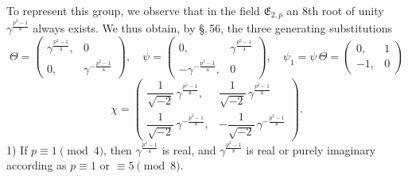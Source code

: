 To represent this group, we observe that in the field
$\mathfrak{E}_{2,p}$ an $8$th root of unity
$\gamma^{\frac{p^2-1}{8}}$ always exists. We thus obtain, by \S.\,56, the
three generating substitutions
\[
\Theta = \begin{pmatrix} \gamma^{\frac{p^2-1}{4}}, & 0 \\[2pt] 0, & \gamma^{-\frac{p^2-1}{4}} \end{pmatrix},
\quad
\psi = \begin{pmatrix} 0, & \gamma^{\frac{p^2-1}{4}} \\[2pt] -\gamma^{-\frac{p^2-1}{4}}, & 0 \end{pmatrix},
\quad
\psi_1 = \psi\,\Theta = \begin{pmatrix} 0, & 1 \\ -1, & 0 \end{pmatrix}
\]
\[
\chi = \begin{pmatrix} \dfrac{1}{\sqrt{-2}}\,\gamma^{\frac{p^2-1}{8}}, & \dfrac{1}{\sqrt{-2}}\,\gamma^{\frac{p^2-1}{8}} \\[8pt] \dfrac{1}{\sqrt{-2}}\,\gamma^{-\frac{p^2-1}{8}}, & -\dfrac{1}{\sqrt{-2}}\,\gamma^{-\frac{p^2-1}{8}} \end{pmatrix}.
\]
1) If $p \equiv 1 \pmod 4$, then $\gamma^{\frac{p^2-1}{4}}$ is real,
and $\gamma^{\frac{p^2-1}{8}}$ is real or purely imaginary according
as $p \equiv 1$ or $\equiv 5 \pmod 8$.
